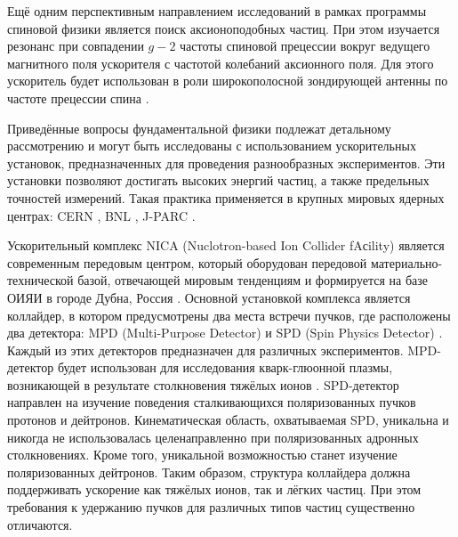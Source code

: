\par	Ещё одним перспективным направлением исследований в рамках программы спиновой физики является поиск аксионоподобных частиц. При этом изучается резонанс при совпадении $g-2$ частоты спиновой прецессии вокруг ведущего магнитного поля ускорителя с частотой колебаний аксионного поля. Для этого ускоритель будет использован в роли широкополосной зондирующей антенны по частоте прецессии спина \cite{Axion_Nikolaev}.

\par	Приведённые вопросы фундаментальной физики подлежат детальному рассмотрению и могут быть исследованы с использованием ускорительных установок, предназначенных для проведения разнообразных экспериментов. Эти установки позволяют достигать высоких энергий частиц, а также предельных точностей измерений. Такая практика применяется в крупных мировых ядерных центрах: CERN \cite{lhc:heavy_ions}, BNL \cite{rhic:design}, J-PARC \cite{j-park}. 

\par	Ускорительный комплекс NICA (Nuclotron-based Ion Collider fAсility) является современным передовым центром, который оборудован передовой материально-технической базой, отвечающей мировым тенденциям и формируется на базе ОИЯИ в городе Дубна, Россия \cite{nuclotron24}. Основной установкой комплекса является коллайдер, в котором предусмотрены два места встречи пучков, где расположены два детектора: MPD (Multi-Purpose Detector) и SPD (Spin Physics Detector) \cite{Ladygin:SPD}. Каждый из этих детекторов предназначен для различных экспериментов. MPD-детектор будет использован для исследования кварк-глюонной плазмы, возникающей в результате столкновения тяжёлых ионов \cite{MPD, Tech_NICA}. SPD-детектор направлен на изучение поведения сталкивающихся поляризованных пучков протонов и дейтронов. Кинематическая область, охватываемая SPD, уникальна и никогда не использовалась целенаправленно при поляризованных адронных столкновениях. Кроме того, уникальной возможностью станет изучение поляризованных дейтронов. Таким образом, структура коллайдера должна поддерживать ускорение как тяжёлых ионов, так и лёгких частиц. При этом требования к удержанию пучков для различных типов частиц существенно отличаются.

